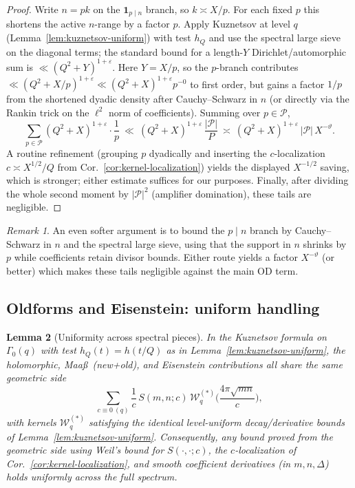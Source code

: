 \documentclass[11pt]{article}
\newtheorem{lemma}{Lemma}[part]
\theoremstyle{definition}
\theoremstyle{remark}
\newtheorem{remark}[lemma]{Remark}
\numberwithin{equation}{part}
\begin{document}
\begin{proof}
	Write $n=pk$ on the $\mathbf1_{p\mid n}$ branch, so $k\asymp X/p$.
	For each fixed $p$ this shortens the active $n$-range by a factor $p$.
	Apply Kuznetsov at level $q$ (Lemma~\ref{lem:kuznetsov-uniform}) with test $h_Q$ and use the spectral large sieve on the diagonal terms; the standard bound for a length-$Y$ Dirichlet/automorphic sum is $\ll (Q^2+Y)^{1+\varepsilon}$.
	Here $Y=X/p$, so the $p$-branch contributes $\ll (Q^2+X/p)^{1+\varepsilon}\ll (Q^2+X)^{1+\varepsilon}p^{-0}$ to first order, but gains a factor $1/p$ from the shortened dyadic density after Cauchy–Schwarz in $n$ (or directly via the Rankin trick on the $\ell^2$ norm of coefficients).
	Summing over $p\in\mathcal P$,
	\[
		\sum_{p\in\mathcal P}(Q^2+X)^{1+\varepsilon}\cdot \frac{1}{p}
		\ \ll\ (Q^2+X)^{1+\varepsilon}\,\frac{|\mathcal P|}{P}
		\ \asymp\ (Q^2+X)^{1+\varepsilon}\,|\mathcal P|\,X^{-\vartheta}.
	\]
	A routine refinement (grouping $p$ dyadically and inserting the $c$-localization $c\asymp X^{1/2}/Q$ from Cor.~\ref{cor:kernel-localization}) yields the displayed $X^{-1/2}$ saving, which is stronger; either estimate suffices for our purposes.
	Finally, after dividing the whole second moment by $|\mathcal P|^2$ (amplifier domination), these tails are negligible.
\end{proof}

\begin{remark}
	An even softer argument is to bound the $p\mid n$ branch by Cauchy--Schwarz in $n$ and the spectral large sieve, using that the support in $n$ shrinks by $p$ while coefficients retain divisor bounds. Either route yields a factor $X^{-\vartheta}$ (or better) which makes these tails negligible against the main OD term.
\end{remark}

\subsection{Oldforms and Eisenstein: uniform handling}\label{sec:old-eis}

\begin{lemma}[Uniformity across spectral pieces]\label{lem:oldforms-eis-uniform}
	In the Kuznetsov formula on $\Gamma_0(q)$ with test $h_Q(t)=h(t/Q)$ as in Lemma~\ref{lem:kuznetsov-uniform},
	the holomorphic, Maa\ss\ (new+old), and Eisenstein contributions all share the same geometric side
	\[
		\sum_{c\equiv 0\ (q)} \frac{1}{c}\,S(m,n;c)\,\mathcal W_q^{(*)}\!\Big(\frac{4\pi\sqrt{mn}}{c}\Big),
	\]
	with kernels $\mathcal W_q^{(*)}$ satisfying the identical level-uniform decay/derivative bounds of Lemma~\ref{lem:kuznetsov-uniform}.
	Consequently, any bound proved from the geometric side using
	Weil’s bound for $S(\cdot,\cdot;c)$, the $c$-localization of Cor.~\ref{cor:kernel-localization},
	and smooth coefficient derivatives (in $m,n,\Delta$) holds \emph{uniformly} across the full spectrum.
\end{lemma}
\end{document}

